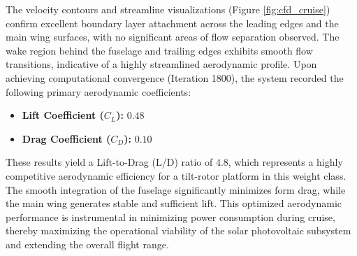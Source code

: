 The velocity contours and streamline visualizations (Figure \ref{fig:cfd_cruise}) confirm excellent boundary layer attachment across the leading edges and the main wing surfaces, with no significant areas of flow separation observed. The wake region behind the fuselage and trailing edges exhibits smooth flow transitions, indicative of a highly streamlined aerodynamic profile. Upon achieving computational convergence (Iteration 1800), the system recorded the following primary aerodynamic coefficients:

\begin{itemize}[noitemsep]
    \item \textbf{Lift Coefficient ($C_L$):} $0.48$
    \item \textbf{Drag Coefficient ($C_D$):} $0.10$
\end{itemize}

These results yield a Lift-to-Drag (L/D) ratio of $4.8$, which represents a highly competitive aerodynamic efficiency for a tilt-rotor platform in this weight class. The smooth integration of the fuselage significantly minimizes form drag, while the main wing generates stable and sufficient lift. This optimized aerodynamic performance is instrumental in minimizing power consumption during cruise, thereby maximizing the operational viability of the solar photovoltaic subsystem and extending the overall flight range.
